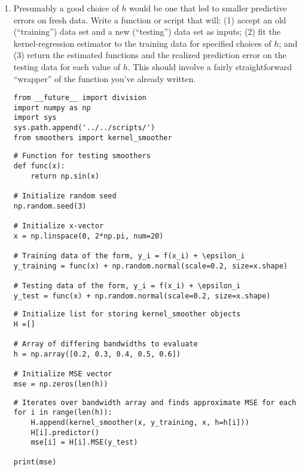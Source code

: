 \documentclass[10pt]{article}
\begin{document}
    \begin{enumerate}[label=(\Alph*)]
        \item Presumably a good choice of $h$ would be one that led to smaller predictive errors on fresh data.  Write a function or script that will: (1) accept an old (``training'') data set and a new (``testing'') data set as inputs; (2) fit the kernel-regression estimator to the training data for specified choices of $h$; and (3) return the estimated functions and the realized prediction error on the testing data for each value of $h$.  This should involve a fairly straightforward ``wrapper'' of the function you've already written.

        \begin{lstlisting}
from __future__ import division
import numpy as np 
import sys
sys.path.append('../../scripts/')
from smoothers import kernel_smoother
        \end{lstlisting}

        \begin{lstlisting}
# Function for testing smoothers
def func(x):
    return np.sin(x)

# Initialize random seed
np.random.seed(3)

# Initialize x-vector
x = np.linspace(0, 2*np.pi, num=20)

# Training data of the form, y_i = f(x_i) + \epsilon_i
y_training = func(x) + np.random.normal(scale=0.2, size=x.shape)

# Testing data of the form, y_i = f(x_i) + \epsilon_i
y_test = func(x) + np.random.normal(scale=0.2, size=x.shape)
        \end{lstlisting}

        \begin{lstlisting}
# Initialize list for storing kernel_smoother objects
H =[]

# Array of differing bandwidths to evaluate
h = np.array([0.2, 0.3, 0.4, 0.5, 0.6])

# Initialize MSE vector
mse = np.zeros(len(h))
        \end{lstlisting}

        \begin{lstlisting}
# Iterates over bandwidth array and finds approximate MSE for each
for i in range(len(h)):
    H.append(kernel_smoother(x, y_training, x, h=h[i]))
    H[i].predictor()
    mse[i] = H[i].MSE(y_test)

print(mse)
        \end{lstlisting}


\end{enumerate}
\end{document}
